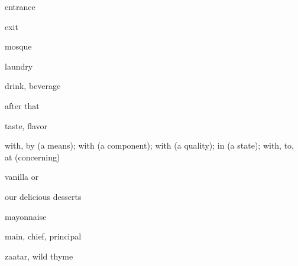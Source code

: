 \documentclass[avery5371,grid,frame]{flashcards}
\begin{document}
\begin{flashcard}{\LARGE entrance}
\LARGE {}
\end{flashcard}
\begin{flashcard}{\LARGE exit}
\LARGE {}
\end{flashcard}
\begin{flashcard}{\LARGE mosque}
\LARGE {}
\end{flashcard}
\begin{flashcard}{\LARGE laundry}
\LARGE {}
\end{flashcard}
\begin{flashcard}{\LARGE drink, beverage}
\LARGE {}
\end{flashcard}
\begin{flashcard}{\LARGE after that}
\LARGE {}
\end{flashcard}
\begin{flashcard}{\LARGE taste, flavor}
\LARGE {}
\end{flashcard}
\begin{flashcard}{\LARGE with, by (a means); with (a component); with (a quality); in (a state); with, to, at (concerning)}
\LARGE {}
\end{flashcard}
\begin{flashcard}{\LARGE vanilla}
\LARGE {} or 
\end{flashcard}
\begin{flashcard}{\LARGE our delicious desserts}
\LARGE {}
\end{flashcard}
\begin{flashcard}{\LARGE mayonnaise}
\LARGE {}
\end{flashcard}
\begin{flashcard}{\LARGE main, chief, principal}
\LARGE {}
\end{flashcard}
\begin{flashcard}{\LARGE zaatar, wild thyme}
\LARGE {}
\end{flashcard}
\end{document}
